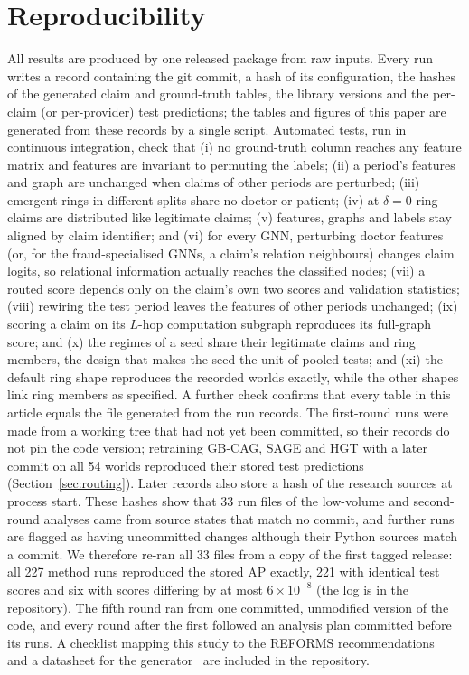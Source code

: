 \documentclass[pdflatex,sn-vancouver-num]{sn-jnl}
\begin{document}
\section{Reproducibility}\label{sec:repro}
All results are produced by one released package from raw inputs. Every run
writes a record containing the git commit, a hash of its configuration, the
hashes of the generated claim and ground-truth tables, the library versions
and the per-claim (or per-provider) test predictions; the tables and figures
of this paper are generated from these records by a single script. Automated
tests, run in continuous integration, check that (i) no ground-truth column
reaches any feature matrix and features are invariant to permuting the labels;
(ii) a period's features and graph are unchanged when claims of other periods
are perturbed; (iii) emergent rings in different splits share no doctor or
patient; (iv) at $\delta=0$ ring claims are distributed like legitimate
claims; (v) features, graphs and labels stay aligned by claim identifier; and
(vi) for every GNN, perturbing doctor features (or, for the fraud-specialised
GNNs, a claim's relation neighbours) changes claim logits, so relational
information actually reaches the classified nodes; (vii) a routed
score depends only on the claim's own two scores and validation statistics;
(viii) rewiring the test period leaves the features of other periods
unchanged; (ix) scoring a claim on its $L$-hop computation subgraph
reproduces its full-graph score; and (x) the regimes of a seed share their
legitimate claims and ring members, the design that makes the seed the unit
of pooled tests; and (xi) the default ring shape reproduces the recorded
worlds exactly, while the other shapes link ring members as specified. A further check confirms that every table in this article
equals the file generated from the run records. The first-round runs were made from a working
tree that had not yet been committed, so their records do not pin the code
version; retraining GB-CAG, SAGE and HGT with a later commit on all 54
worlds reproduced their stored test predictions (Section~\ref{sec:routing}).
Later records also store a hash of the research sources at process start.
These hashes show that 33 run files of the low-volume and second-round
analyses came from source states that match no commit, and further runs are
flagged as having uncommitted changes although their Python sources match a
commit. We therefore re-ran all 33 files from a copy of the first tagged
release: all 227 method runs reproduced the stored AP exactly, 221 with
identical test scores and six with scores differing by at most
$6\times10^{-8}$ (the log is in the repository). The fifth round ran from one
committed, unmodified version of the code, and every round after the first
followed an analysis plan committed before its runs. A checklist
mapping this study to the REFORMS recommendations~\cite{kapoor2024reforms}
and a datasheet for the generator~\cite{gebru2021datasheets} are included in
the repository.
\end{document}
